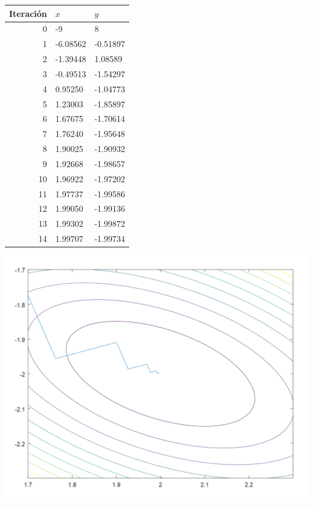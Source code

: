 \begin{table}[h]
    \centering
    \begin{tabular}{r|l|l}
        Iteración & $x$ &    $y$   \\
        \hline
         0  &  -9  &  8 \\
         1  & -6.08562 & -0.51897 \\
         2  &  -1.39448 & 1.08589 \\
         3  & -0.49513 & -1.54297 \\
         4  & 0.95250 & -1.04773 \\
         5  &   1.23003 & -1.85897 \\
         6  & 1.67675 &  -1.70614 \\
         7  & 1.76240 & -1.95648 \\
         8  & 1.90025 & -1.90932 \\
         9  & 1.92668 & -1.98657 \\
         10  & 1.96922 & -1.97202\\
         11  & 1.97737 & -1.99586 \\
         12  & 1.99050 & -1.99136 \\
         13  & 1.99302 & -1.99872 \\
         14  & 1.99707 & -1.99734 \\
    \end{tabular}
\end{table}

\begin{center}
    \includegraphics[scale=0.5]{AlfioQuarteroni/Victor.png} 
\end{center}


